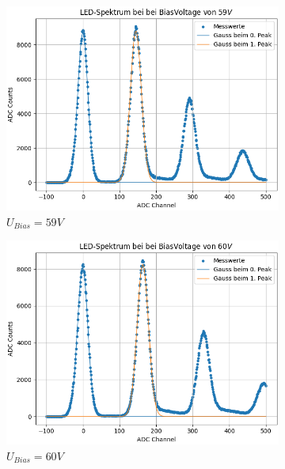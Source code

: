 \documentclass[12pt]{article}
\begin{document}
\begin{figure}[h!]
\begin{subfigure}{0.32\textwidth}
    \includegraphics[width=\textwidth]{Grafiken/gaussfit_59}
    \caption{$U_{Bias}=59V$}
  \end{subfigure}
  \hfill
  \begin{subfigure}{0.32\textwidth}
    \includegraphics[width=\textwidth]{Grafiken/gaussfit_60}
    \caption{$U_{Bias}=60V$}
  \end{subfigure}
  \hfill
  \begin{subfigure}{0.32\textwidth}

\end{subfigure}
\end{figure}
\end{document}
